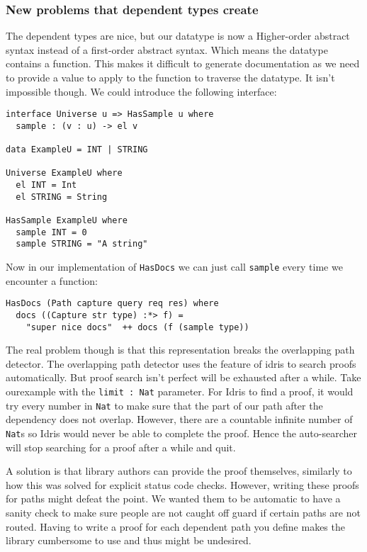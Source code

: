 \documentclass[12pt,a4paper]{article}
\begin{document}
\subsubsection{New problems that dependent types create}
The dependent types are nice, but our datatype is now a Higher-order abstract syntax instead of a first-order abstract syntax.
Which means the datatype contains a function.  This makes it difficult to generate documentation as we need to provide a value
to apply to the function to traverse the datatype. It isn't impossible though. We could introduce the following interface:
\begin{verbatim}
interface Universe u => HasSample u where
  sample : (v : u) -> el v

data ExampleU = INT | STRING

Universe ExampleU where
  el INT = Int
  el STRING = String

HasSample ExampleU where
  sample INT = 0
  sample STRING = "A string"
\end{verbatim}
Now in our implementation of \texttt{HasDocs} we can just call \texttt{sample}
every time we encounter a function:
\begin{verbatim}
HasDocs (Path capture query req res) where
  docs ((Capture str type) :*> f) =
    "super nice docs"  ++ docs (f (sample type))
\end{verbatim}

The real problem though is that this representation breaks the overlapping path detector.
The overlapping path detector uses the feature of idris to search proofs automatically. But
proof search isn't perfect will be exhausted after a while. Take ourexample with the
\texttt{limit : Nat} parameter. For Idris to find a proof, it would try every number
in \texttt{Nat} to  make sure that the part of our path after the dependency does
not overlap. However, there are a countable infinite number of \texttt{Nat}s so
Idris would never be able to complete the proof. Hence the auto-searcher will stop searching
for a proof after a while and quit.

A solution is that library authors can provide the proof themselves, similarly to how this
was solved for explicit status code checks.  However, writing these proofs for paths might
defeat the point. We wanted them to be automatic to have a sanity check to make sure
people are not caught off guard if certain paths are not routed. Having to write a proof
for each dependent path you define makes the library cumbersome to use and thus might
be undesired.
\end{document}
